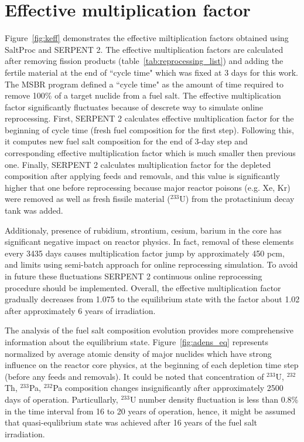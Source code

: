 \section{Effective multiplication factor}
Figure~\ref{fig:keff} demonstrates the effective miltiplication factors obtained using SaltProc and SERPENT 2. The effective multiplication factors are calculated after removing fission products (table~\ref{tab:reprocessing_list}) and adding the fertile material at the end of ``cycle time" which was fixed at 3 days for this work. The \gls{MSBR} program defined a ``cycle time" as the amount of time required to remove 100\% of a target nuclide from a fuel salt. The effective multiplication factor significantly fluctuates because of descrete way to simulate online reprocessing. First, SERPENT 2 calculates effective multiplication factor for the beginning of cycle time (fresh fuel composition for the first step). Following this, it computes new fuel salt composition for the end of 3-day step and corresponding effective multiplication factor which is much smaller then previous one. Finally, SERPENT 2 calculates multiplication factor for the depleted composition after applying feeds and removals, and this value is significantly higher that one before reprocessing because major reactor poisons (e.g. Xe, Kr) were removed as well as fresh fissile material ($^{233}$U) from the protactinium decay tank was added. 

Additionaly, presence of rubidium, strontium, cesium, barium in the core has significant negative impact on reactor physics. In fact, removal of these elements every 3435 days causes multiplication factor jump by approximately 450 pcm, and limits using semi-batch approach for online reprocessing simulation. To avoid in future these fluctuations SERPENT 2 continuous online reprocessing procedure should be implemented. Overall, the effective multiplication factor gradually decreases from 1.075 to the equilibrium state with the factor about 1.02 after approximately 6 years of irradiation. 

The analysis of the fuel salt composition evolution provides more comprehensive information about the equilibrium state. Figure~\ref{fig:adens_eq} represents normalized by average atomic density of major nuclides which have strong influence on the reactor core physics, at the beginning of each depletion time step (before any feeds and removals). It could be noted that concentration of $^{233}$U, $^{232}$Th, $^{233}$Pa, $^{232}$Pa composition changes insignificantly after approximately 2500 days of operation. Particullarly, $^{233}$U number density fluctuation is less than 0.8\% in the time interval from 16 to 20 years of operation, hence, it might be assumed that quasi-equlibrium state was achieved after 16 years of the fuel salt irradiation.

